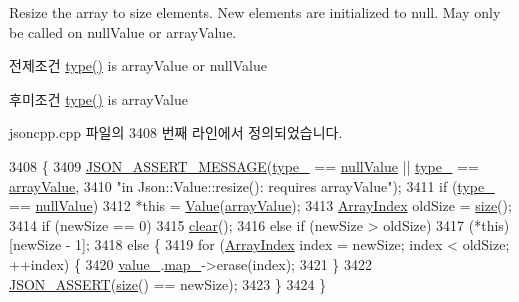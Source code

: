 Resize the array to size elements. New elements are initialized to null. May only be called on null\+Value or array\+Value. \begin{DoxyPrecond}{전제조건}
\hyperlink{class_json_1_1_value_a8ce61157a011894f0252ceed232312de}{type()} is array\+Value or null\+Value 
\end{DoxyPrecond}
\begin{DoxyPostcond}{후미조건}
\hyperlink{class_json_1_1_value_a8ce61157a011894f0252ceed232312de}{type()} is array\+Value 
\end{DoxyPostcond}


jsoncpp.\+cpp 파일의 3408 번째 라인에서 정의되었습니다.


\begin{DoxyCode}
3408                                      \{
3409   \hyperlink{json_8h_ad7facdeeca0f495765e3b204c265eadb}{JSON\_ASSERT\_MESSAGE}(\hyperlink{class_json_1_1_value_abd222c2536dc88bf330dedcd076d2356}{type\_} == \hyperlink{namespace_json_a7d654b75c16a57007925868e38212b4ea7d9899633b4409bd3fc107e6737f8391}{nullValue} || 
      \hyperlink{class_json_1_1_value_abd222c2536dc88bf330dedcd076d2356}{type\_} == \hyperlink{namespace_json_a7d654b75c16a57007925868e38212b4eadc8f264f36b55b063c78126b335415f4}{arrayValue},
3410                       \textcolor{stringliteral}{"in Json::Value::resize(): requires arrayValue"});
3411   \textcolor{keywordflow}{if} (\hyperlink{class_json_1_1_value_abd222c2536dc88bf330dedcd076d2356}{type\_} == \hyperlink{namespace_json_a7d654b75c16a57007925868e38212b4ea7d9899633b4409bd3fc107e6737f8391}{nullValue})
3412     *\textcolor{keyword}{this} = \hyperlink{class_json_1_1_value_ada6ba1369448fb0240bccc36efaa46f7}{Value}(\hyperlink{namespace_json_a7d654b75c16a57007925868e38212b4eadc8f264f36b55b063c78126b335415f4}{arrayValue});
3413   \hyperlink{namespace_json_a8048e741f2177c3b5d9ede4a5b8c53c2}{ArrayIndex} oldSize = \hyperlink{class_json_1_1_value_a0ec2808e1d7efa4e9fad938d6667be44}{size}();
3414   \textcolor{keywordflow}{if} (newSize == 0)
3415     \hyperlink{class_json_1_1_value_a501a4d67e6c875255c2ecc03ccd2019b}{clear}();
3416   \textcolor{keywordflow}{else} \textcolor{keywordflow}{if} (newSize > oldSize)
3417     (*this)[newSize - 1];
3418   \textcolor{keywordflow}{else} \{
3419     \textcolor{keywordflow}{for} (\hyperlink{namespace_json_a8048e741f2177c3b5d9ede4a5b8c53c2}{ArrayIndex} index = newSize; index < oldSize; ++index) \{
3420       \hyperlink{class_json_1_1_value_aef578244546212705b9f81eb84d7e151}{value\_}.\hyperlink{union_json_1_1_value_1_1_value_holder_a1e7a5b86d4f52234f55c847ad1ce389a}{map\_}->erase(index);
3421     \}
3422     \hyperlink{json_8h_a188941dcc789ccb6539c3d6f41405582}{JSON\_ASSERT}(\hyperlink{class_json_1_1_value_a0ec2808e1d7efa4e9fad938d6667be44}{size}() == newSize);
3423   \}
3424 \}
\end{DoxyCode}
